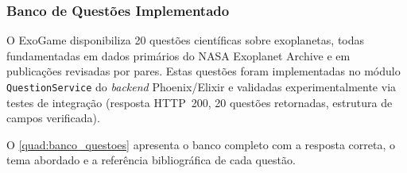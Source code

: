 \documentclass[
	12pt,
	openany,
	oneside,
	a4paper,
	english,
	brazil
]{abntex2}
\begin{document}
\subsubsection{Banco de Questões Implementado}\label{sec:banco_questoes}

O ExoGame disponibiliza 20 questões científicas sobre exoplanetas, todas fundamentadas em dados primários do NASA Exoplanet Archive \cite{nasaexoplanet2024, akeson2013} e em publicações revisadas por pares. Estas questões foram implementadas no módulo \texttt{QuestionService} do \textit{backend} Phoenix/Elixir e validadas experimentalmente via testes de integração (resposta HTTP~200, 20 questões retornadas, estrutura de campos verificada).

O \autoref{quad:banco_questoes} apresenta o banco completo com a resposta correta, o tema abordado e a referência bibliográfica de cada questão.
\end{document}
